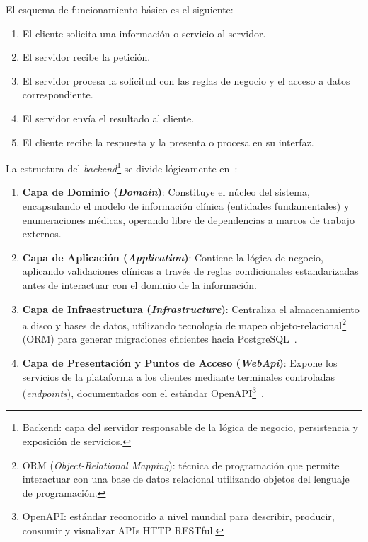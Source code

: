 El esquema de funcionamiento básico es el siguiente:
\begin{enumerate}
    \item El cliente solicita una información o servicio al servidor.
    \item El servidor recibe la petición.
    \item El servidor procesa la solicitud con las reglas de negocio y el acceso a datos correspondiente.
    \item El servidor envía el resultado al cliente.
    \item El cliente recibe la respuesta y la presenta o procesa en su interfaz.
\end{enumerate}


La estructura del \textit{backend}\footnote{Backend: capa del servidor responsable de la lógica de negocio, persistencia y exposición de servicios.} se divide lógicamente en~\cite{martin_clean_architecture}:
\begin{enumerate}
    \item \textbf{Capa de Dominio (\textit{Domain})}: Constituye el núcleo del sistema, encapsulando el 
    modelo de información clínica (entidades fundamentales) y enumeraciones médicas, operando libre de 
    dependencias a marcos de trabajo externos.
    \item \textbf{Capa de Aplicación (\textit{Application})}: Contiene la lógica de negocio, aplicando 
    validaciones clínicas a través de reglas condicionales estandarizadas antes de interactuar 
    con el dominio de la información.
    \item \textbf{Capa de Infraestructura (\textit{Infrastructure})}: Centraliza el almacenamiento a 
    disco y bases de datos, utilizando tecnología de mapeo objeto-relacional\footnote{ORM (\textit{Object-Relational Mapping}): técnica de programación que permite interactuar con una base de datos relacional utilizando objetos del lenguaje de programación.} (ORM) para generar 
    migraciones eficientes hacia PostgreSQL~\cite{ef_core_docs,postgresql_docs}.
    \item \textbf{Capa de Presentación y Puntos de Acceso (\textit{WebApi})}: Expone los servicios de la 
    plataforma a los clientes mediante terminales controladas (\textit{endpoints}), documentados con el 
    estándar OpenAPI\footnote{OpenAPI: estándar reconocido a nivel mundial para describir, producir, consumir 
    y visualizar APIs HTTP RESTful.}~\cite{openapi_spec}.
\end{enumerate}

